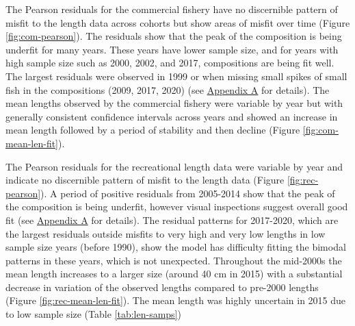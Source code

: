 \documentclass[11pt,
  english,
  a4paper,
]{article}
\begin{document}
\leavevmode\tagmcend\tagstructend\par


The Pearson residuals for the commercial fishery have no discernible pattern of misfit to the length data across cohorts but show areas of misfit over time (Figure \ref{fig:com-pearson}). The residuals show that the peak of the composition is being underfit for many years. These years have lower sample size, and for years with high sample size such as 2000, 2002, and 2017, compositions are being fit well. The largest residuals were observed in 1999 or when missing small spikes of small fish in the compositions (2009, 2017, 2020) (see {\protect\hyperlink{append_a}{Appendix A}\leavevmode\tagmcend\tagstructend} for details). The mean lengths observed by the commercial fishery were variable by year but with generally consistent confidence intervals across years and showed an increase in mean length followed by a period of stability and then decline (Figure \ref{fig:com-mean-len-fit}).

\leavevmode\tagmcend\tagstructend\par


The Pearson residuals for the recreational length data were variable by year and indicate no discernible pattern of misfit to the length data (Figure \ref{fig:rec-pearson}). A period of positive residuals from 2005-2014 show that the peak of the composition is being underfit, however visual inspections suggest overall good fit (see {\protect\hyperlink{append_a}{Appendix A}\leavevmode\tagmcend\tagstructend} for details). The residual patterns for 2017-2020, which are the largest residuals outside misfits to very high and very low lengths in low sample size years (before 1990), show the model has difficulty fitting the bimodal patterns in these years, which is not unexpected. Throughout the mid-2000s the mean length increases to a larger size (around 40 cm in 2015) with a substantial decrease in variation of the observed lengths compared to pre-2000 lengths (Figure \ref{fig:rec-mean-len-fit}). The mean length was highly uncertain in 2015 due to low sample size (Table \ref{tab:len-samps})

\leavevmode\tagmcend\tagstructend\par

\end{document}
